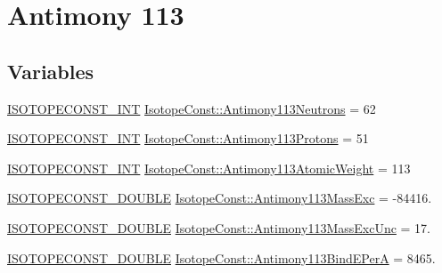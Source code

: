 \hypertarget{group___isotope_const-_antimony-_sb113}{}\section{Antimony 113}
\label{group___isotope_const-_antimony-_sb113}
\subsection*{Variables}
\begin{DoxyCompactItemize}
\item 
\mbox{\hyperlink{group___isotope_const-_macros_ga5f18360b3e99483a35c32d789e62621c}{I\+S\+O\+T\+O\+P\+E\+C\+O\+N\+S\+T\+\_\+\+I\+NT}} \mbox{\hyperlink{group___isotope_const-_antimony-_sb113_gae473f1da5f3ae225e4c14faf203771b5}{Isotope\+Const\+::\+Antimony113\+Neutrons}} = 62
\item 
\mbox{\hyperlink{group___isotope_const-_macros_ga5f18360b3e99483a35c32d789e62621c}{I\+S\+O\+T\+O\+P\+E\+C\+O\+N\+S\+T\+\_\+\+I\+NT}} \mbox{\hyperlink{group___isotope_const-_antimony-_sb113_gaa2592c97bc043b51ffa35ad133049591}{Isotope\+Const\+::\+Antimony113\+Protons}} = 51
\item 
\mbox{\hyperlink{group___isotope_const-_macros_ga5f18360b3e99483a35c32d789e62621c}{I\+S\+O\+T\+O\+P\+E\+C\+O\+N\+S\+T\+\_\+\+I\+NT}} \mbox{\hyperlink{group___isotope_const-_antimony-_sb113_ga784c948a69c595a84bb0cb719d909449}{Isotope\+Const\+::\+Antimony113\+Atomic\+Weight}} = 113
\item 
\mbox{\hyperlink{group___isotope_const-_macros_ga8f45a7272ce02c0b4c65c44636ed719a}{I\+S\+O\+T\+O\+P\+E\+C\+O\+N\+S\+T\+\_\+\+D\+O\+U\+B\+LE}} \mbox{\hyperlink{group___isotope_const-_antimony-_sb113_ga2bfc2e0e3d679c8e622a3143742b51dc}{Isotope\+Const\+::\+Antimony113\+Mass\+Exc}} = -\/84416.
\item 
\mbox{\hyperlink{group___isotope_const-_macros_ga8f45a7272ce02c0b4c65c44636ed719a}{I\+S\+O\+T\+O\+P\+E\+C\+O\+N\+S\+T\+\_\+\+D\+O\+U\+B\+LE}} \mbox{\hyperlink{group___isotope_const-_antimony-_sb113_gac050547dc4d1d3f8ecd9f1b4094f837c}{Isotope\+Const\+::\+Antimony113\+Mass\+Exc\+Unc}} = 17.
\item 
\mbox{\hyperlink{group___isotope_const-_macros_ga8f45a7272ce02c0b4c65c44636ed719a}{I\+S\+O\+T\+O\+P\+E\+C\+O\+N\+S\+T\+\_\+\+D\+O\+U\+B\+LE}} \mbox{\hyperlink{group___isotope_const-_antimony-_sb113_gafb97496d7de21abda488f276088ff5a9}{Isotope\+Const\+::\+Antimony113\+Bind\+E\+PerA}} = 8465.
\item 

\end{DoxyCompactItemize}
